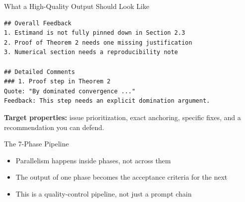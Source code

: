 \documentclass[10pt,english,aspectratio=169]{beamer}
\begin{document}
\begin{frame}[fragile]{What a High-Quality Output Should Look Like}
\begin{tcolorbox}[colback=gray!5, colframe=gray!40, title={\footnotesize Shortened review template}, fonttitle=\bfseries\footnotesize]
\begin{lstlisting}[style=markdownstyle, basicstyle=\ttfamily\scriptsize]
## Overall Feedback
1. Estimand is not fully pinned down in Section 2.3
2. Proof of Theorem 2 needs one missing justification
3. Numerical section needs a reproducibility note

## Detailed Comments
### 1. Proof step in Theorem 2
Quote: "By dominated convergence ..."
Feedback: This step needs an explicit domination argument.
\end{lstlisting}
\end{tcolorbox}

\vspace{0.25cm}
\textbf{Target properties:} issue prioritization, exact anchoring, specific fixes, and a recommendation you can defend.
\end{frame}

\begin{frame}{The 7-Phase Pipeline}
\begin{center}
\end{center}

\vspace{0.25cm}
\begin{itemize}
    \item Parallelism happens inside phases, not across them
    \item The output of one phase becomes the acceptance criteria for the next
    \item This is a quality-control pipeline, not just a prompt chain
\end{itemize}
\end{frame}
\end{document}
